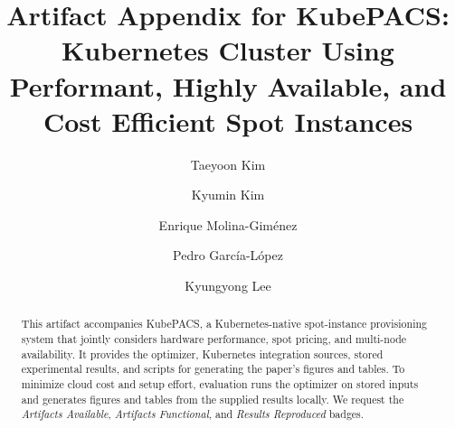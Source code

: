 \documentclass[sigconf,9pt,nonacm,balance=false]{acmart}
\begin{document}
\title[Artifact Appendix for KubePACS]{Artifact Appendix for KubePACS:
Kubernetes Cluster Using Performant, Highly Available,
and Cost Efficient Spot Instances}

\author{Taeyoon Kim}
\author{Kyumin Kim}
\authornotemark[1]
\author{Enrique Molina-Gim\'enez}
\author{Pedro Garc\'ia-L\'opez}
\author{Kyungyong Lee}

\renewcommand{\shortauthors}{Kim et al.}
\begin{abstract}
This artifact accompanies KubePACS, a Kubernetes-native spot-instance
provisioning system that jointly considers hardware performance, spot
pricing, and multi-node availability. It provides the optimizer,
Kubernetes integration sources, stored experimental results,
and scripts for generating the paper's figures and tables. To minimize cloud
cost and setup effort, evaluation runs the optimizer on stored inputs and
generates figures and tables from the supplied results locally. We request the
\emph{Artifacts Available}, \emph{Artifacts Functional}, and
\emph{Results Reproduced} badges.
\end{abstract}
\maketitle
\end{document}
